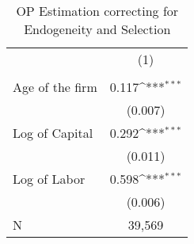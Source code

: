 \begin{table}[htbp]\centering
\def\sym#1{\ifmmode^{#1}\else\(^{#1}\)\fi}
\caption{OP Estimation correcting for Endogeneity and Selection \label{tab:q5e}}
\begin{tabular}{l*{1}{c}}
\toprule
                    &\multicolumn{1}{c}{(1)}\\
                    &\multicolumn{1}{c}{} \\
\midrule
Age of the firm     &       0.117\sym{***}\\
                    &     (0.007)         \\
\addlinespace
Log of Capital      &       0.292\sym{***}\\
                    &     (0.011)         \\
\addlinespace
Log of Labor        &       0.598\sym{***}\\
                    &     (0.006)         \\
\midrule
N                   &      39,569         \\
\bottomrule
\end{tabular}
\end{table}
